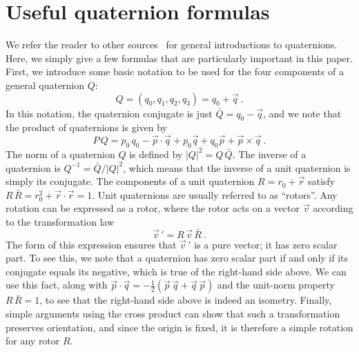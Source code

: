 \documentclass[aps,prd,amsmath,floatfix,twocolumn,superscriptaddress,nofootinbib,showpacs]{revtex4-1}
\newcommand{\abs}[1]{\lvert#1\rvert}
\begin{document}
\section{Useful quaternion formulas}
\label{sec:UsefulQuaternionFormulas}


We refer the reader to other sources~\cite{DoranLasenby:2003,
  Boyle:2013} for general introductions to quaternions.  Here, we
simply give a few formulas that are particularly important in this
paper.  First, we introduce some basic notation to be used for the
four components of a general quaternion $Q$:
\begin{equation}
  \label{eq:QuaternionComponents}
  Q = (q_{0}, q_{1}, q_{2}, q_{3}) = q_{0} + \vec{q}~.
\end{equation}
In this notation, the quaternion conjugate is just $\bar{Q} = q_{0} -
\vec{q}$, and we note that the product of quaternions is given by
\begin{equation}
  \label{eq:QuaternionProduct}
  P\, Q = p_{0}\, q_{0} - \vec{p} \cdot \vec{q} + p_{0}\vec{q}+q_{0}\vec{p}+ \vec{p} \times
  \vec{q}~.
\end{equation}
The norm of a quaternion $Q$ is defined by
  $\abs{Q}^2 = Q\, \bar{Q}$.  The inverse of a quaternion is
$Q^{-1} = \bar{Q} / \abs{Q}^{2}$, which means that the inverse of a
unit quaternion is simply its conjugate.  The components of a unit
quaternion $R=r_0+\vec r$ satisfy
$R\, \bar{R} = r_0^2+\vec r\cdot\vec r=1$.  Unit quaternions are
  usually referred to as ``rotors''.  Any rotation can be expressed as
  a rotor, where the rotor acts on a vector $\vec{v}$ according to the
  transformation law
\begin{equation}
  \label{eq:VectorTransformationLaw}
  \vec{v}\,' = R\, \vec{v}\, \bar{R}~.
\end{equation}
The form of this expression ensures that $\vec{v}\,'$ is a pure
  vector; it has zero scalar part.  To see this, we note that a
  quaternion has zero scalar part if and only if its conjugate equals
  its negative, which is true of the right-hand side above.  We can
  use this fact, along with
  $\vec{p} \cdot \vec{q} = -\frac{1}{2} (\vec{p}\, \vec{q} + \vec{q}\,
  \vec{p})$
  and the unit-norm property $R\, \bar{R} = 1$, to see that the
  right-hand side above is indeed an isometry.  Finally, simple
  arguments using the cross product can show that such a
  transformation preserves orientation, and since the origin is fixed,
  it is therefore a simple rotation for any rotor $R$.
\end{document}

